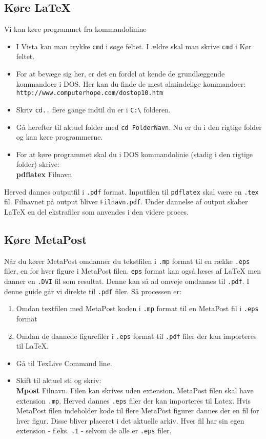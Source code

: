 \documentclass{article}
\begin{document}
 \subsection{Køre \LaTeX{}}
Vi kan køre programmet fra kommandolinine
\begin{itemize}
\item I Vista kan man trykke \verb"cmd" i søge feltet. I ældre skal man skrive \verb"cmd" i Kør feltet.
\item For at bevæge sig her, er det en fordel at kende de grundlæggende kommandoer i DOS.
Her kan du finde de mest almindelige kommandoer:\\ \verb"http://www.computerhope.com/dostop10.htm"
\item Skriv \verb"cd.." flere gange indtil du er i \verb"C:\" folderen.
\item Gå herefter til aktuel folder med \verb"cd FolderNavn".
Nu er du i den rigtige folder og kan køre programmerne.
\item For at køre programmet skal du i DOS kommandolinie (stadig i den rigtige folder) skrive:\\
\textbf{pdflatex} Filnavn 
\end{itemize}
Herved dannes outputfil i \verb".pdf" format.
Inputfilen til \verb"pdflatex" skal være en \verb".tex" fil. 
Filnavnet på output bliver \verb"Filnavn.pdf".
Under dannelse af output skaber \LaTeX{} en del ekstrafiler som anvendes i den videre proces. 

\subsection{Køre MetaPost}
Når du kører MetaPost omdanner du tekstfilen i \verb".mp" format til en række \verb".eps" filer, en for hver figure i MetaPost filen. \verb"eps" format kan også læses af \LaTeX{} men danner en \verb".DVI" fil som resultat. Denne kan så ad omveje omdannes til \verb".pdf". I denne guide går vi direkte til \verb".pdf" filer. Så processen er:
\begin{enumerate}
\item Omdan textfilen med MetaPost koden i \verb".mp" format til en MetaPost fil i \verb".eps" format
\item Omdan de dannede figurefiler i \verb".eps" format til \verb".pdf" filer der kan importeres til \LaTeX{}.
\end{enumerate}
\begin{itemize}
\item Gå til TexLive Command line.
\item Skift til aktuel sti og skriv:\\
\textbf{Mpost} Filnavn.
Filen kan skrives uden extension. MetaPost filen skal have extension \verb".mp".
Herved dannes \verb".eps" filer der kan importeres til Latex. Hvis MetaPost filen indeholder kode til flere MetaPost figurer dannes der en fil for hver figur. Disse bliver placeret i det aktuelle arkiv. Hver fil har sin egen extension - f.eks. \verb".1" - selvom de alle er \verb".eps" filer.
\end{itemize}
\end{document}
